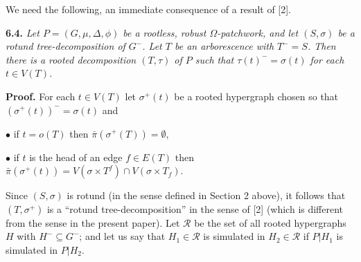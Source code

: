 We need the following, an immediate consequence of a result of [2].

\textbf{6.4.} \textit{Let $P = (G, \mu, \Delta, \phi)$ be a rootless, robust $\Omega$-patchwork, and let $(S, \sigma)$ be a rotund tree-decomposition of $G^-$. Let $T$ be an arborescence with $T^- = S$. Then there is a rooted decomposition $(T, \tau)$ of $P$ such that $\tau(t)^- = \sigma(t)$ for each $t \in V(T)$.}

\textbf{Proof.} For each $t \in V(T)$ let $\sigma^+(t)$ be a rooted hypergraph chosen so that $(\sigma^+(t))^- = \sigma(t)$ and

\hspace*{12pt}$\bullet$ if $t = o(T)$ then $\bar{\pi}(\sigma^+(T)) = \emptyset$,

\hspace*{12pt}$\bullet$ if $t$ is the head of an edge $f \in E(T)$ then $\bar{\pi}(\sigma^+(t)) = V(\sigma \times T^f) \cap V(\sigma \times T_f)$.

Since $(S, \sigma)$ is rotund (in the sense defined in Section 2 above), it follows that $(T, \sigma^+)$ is a ``rotund tree-decomposition'' in the sense of [2] (which is different from the sense in the present paper). Let $\mathscr{R}$ be the set of all rooted hypergraphs $H$ with $H^- \subseteq G^-$; and let us say that $H_1 \in \mathscr{R}$ is simulated in $H_2 \in \mathscr{R}$ if $P|H_1$ is simulated in $P|H_2$.
